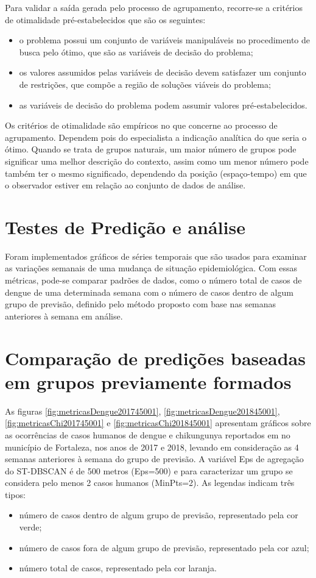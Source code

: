 Para validar a saída gerada pelo processo de agrupamento, recorre-se a critérios de otimalidade pré-estabelecidos que são os seguintes:
\begin{itemize}
    \item o problema possui um conjunto de variáveis manipuláveis no procedimento de busca pelo ótimo, que são as variáveis de decisão do problema;
    \item os valores assumidos pelas variáveis de decisão devem satisfazer um conjunto de restrições, que compõe a região de soluções viáveis do problema;
    \item as variáveis de decisão do problema podem assumir valores pré-estabelecidos.
\end{itemize}

Os critérios de otimalidade são empíricos no que concerne ao processo de agrupamento. Dependem pois do especialista a indicação analítica do que seria o ótimo. Quando se trata de grupos naturais, um maior número de grupos pode significar uma melhor descrição do contexto, assim como um menor número pode também ter o mesmo significado, dependendo da posição (espaço-tempo) em que o observador estiver em relação ao conjunto de dados de análise.

\section{Testes de Predição e análise}

Foram implementados gráficos de séries temporais que são usados para examinar as variações semanais de uma mudança de situação epidemiológica. Com essas métricas, pode-se comparar padrões de dados, como o número total de casos de dengue de uma determinada semana com o número de casos dentro de algum grupo de previsão, definido pelo método proposto com base nas semanas anteriores à semana em análise.

\section{Comparação de predições baseadas em grupos previamente formados}

As figuras \ref{fig:metricasDengue201745001}, \ref{fig:metricasDengue201845001}, \ref{fig:metricasChi201745001} e \ref{fig:metricasChi201845001} apresentam gráficos sobre as ocorrências de casos humanos de dengue e chikungunya reportados em \cite{simda} no município de Fortaleza, nos anos de 2017 e 2018, levando em consideração as 4 semanas anteriores à semana do grupo de previsão. A variável Eps de agregação do \acrshort{ST-DBSCAN} é de 500 metros (Eps=500) e para caracterizar um grupo se considera pelo menos 2 casos humanos (MinPts=2).
As legendas indicam três tipos:
\begin{itemize}
    \item número de casos dentro de algum grupo de previsão, representado pela cor verde;
    \item número de casos fora de algum grupo de previsão, representado pela cor azul;
    \item número total de casos, representado pela cor laranja.
\end{itemize}

